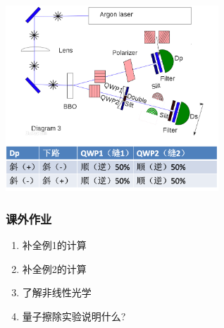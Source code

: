 \begin{frame}
    \frametitle{}
    \begin{center}
        \includegraphics[width=0.6\textwidth]{figs/c3.png} \\
    \end{center} 
\end{frame}

\begin{frame}
    \frametitle{课外作业}
    \begin{enumerate}
        \item 补全例1的计算
        \item 补全例2的计算
        \item 了解非线性光学
        \item 量子擦除实验说明什么?
    \end{enumerate}
\end{frame}

